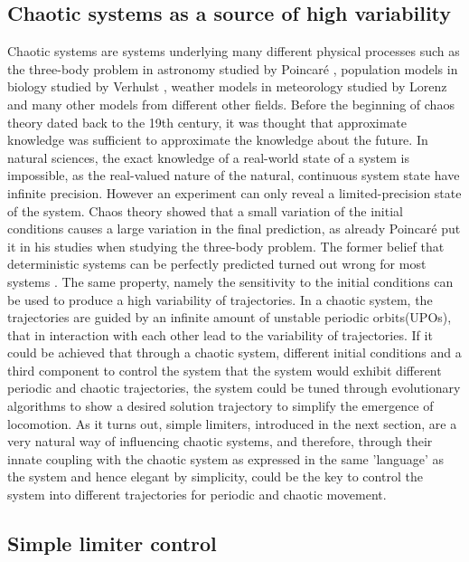 \documentclass[main]{subfiles}
\begin{document}

\subsection{Chaotic systems as a source of high variability}

Chaotic systems are systems underlying many different physical processes such as the three-body problem in astronomy studied by Poincaré \cite{bib:Poincare1892}, population models in biology studied by Verhulst \cite{bib:Verhulst1838}, weather models in meteorology studied by Lorenz \cite{bib:Lorenz1963} and many other models from different other fields. Before the beginning of chaos theory dated back to the 19th century, it was thought that approximate knowledge was sufficient to approximate the knowledge about the future. In natural sciences, the exact knowledge of a real-world state of a system is impossible, as the real-valued nature of the natural, continuous system state have infinite precision. However an experiment can only reveal a limited-precision state of the system. Chaos theory showed that a small variation of the initial conditions causes a large variation in the final prediction, as already Poincaré put it in his studies when studying the three-body problem. The former belief that deterministic systems can be perfectly predicted turned out wrong for most systems \cite{bib:Motter2013}. The same property, namely the sensitivity to the initial conditions can be used to produce a high variability of trajectories. In a chaotic system, the trajectories are guided by an infinite amount of unstable periodic orbits(UPOs), that in interaction with each other lead to the variability of trajectories. If it could be achieved that through a chaotic system, different initial conditions and a third component to control the system that the system would exhibit different periodic and chaotic trajectories, the system could be tuned through evolutionary algorithms to show a desired solution trajectory to simplify the emergence of locomotion. As it turns out, simple limiters, introduced in the next section, are a very natural way of influencing chaotic systems, and therefore, through their innate coupling with the chaotic system as expressed in the same 'language' as the system and hence elegant by simplicity, could be the key to control the system into different trajectories for periodic and chaotic movement.

\subsection{Simple limiter control}


\lipsum[1]
\end{document}
